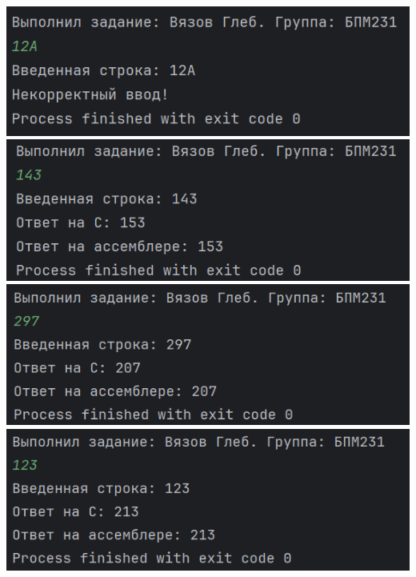 \documentclass[12pt]{article}
\begin{document}
    \includegraphics[width=\linewidth]{img1}
	\includegraphics[width=\linewidth]{img2}
    \includegraphics[width=\linewidth]{img3}
    \includegraphics[width=\linewidth]{img4}
\end{document}
